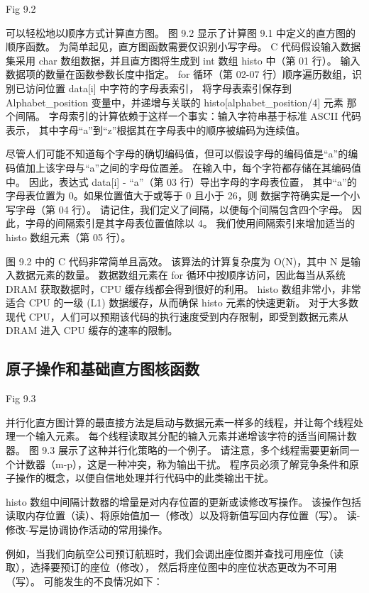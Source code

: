 {\color{red} Fig 9.2}

可以轻松地以顺序方式计算直方图。 图 9.2 显示了计算图 9.1 中定义的直方图的顺序函数。 
为简单起见，直方图函数需要仅识别小写字母。 
C 代码假设输入数据集采用 char 数组数据，并且直方图将生成到 int 数组 histo 中（第 01 行）。 
输入数据项的数量在函数参数长度中指定。 
for 循环（第 02-07 行）顺序遍历数组，识别已访问位置 data[i] 中字符的字母表索引，
将字母表索引保存到 Alphabet\_position 变量中，并递增与关联的 histo[alphabet\_position/4] 元素 那个间隔。 
字母索引的计算依赖于这样一个事实：输入字符串基于标准 ASCII 代码表示，
其中字母“a”到“z”根据其在字母表中的顺序被编码为连续值。

尽管人们可能不知道每个字母的确切编码值，但可以假设字母的编码值是“a”的编码值加上该字母与“a”之间的字母位置差。 
在输入中，每个字符都存储在其编码值中。 因此，表达式 data[i] - “a”（第 03 行）导出字母的字母表位置，
其中“a”的字母表位置为 0。如果位置值大于或等于 0 且小于 26，则 数据字符确实是一个小写字母（第 04 行）。 
请记住，我们定义了间隔，以便每个间隔包含四个字母。 因此，字母的间隔索引是其字母表位置值除以 4。
我们使用间隔索引来增加适当的 histo 数组元素（第 05 行）。

图 9.2 中的 C 代码非常简单且高效。 该算法的计算复杂度为 O(N)，其中 N 是输入数据元素的数量。 
数据数组元素在 for 循环中按顺序访问，因此每当从系统 DRAM 获取数据时，CPU 缓存线都会得到很好的利用。 
histo 数组非常小，非常适合 CPU 的一级 (L1) 数据缓存，从而确保 histo 元素的快速更新。 
对于大多数现代 CPU，人们可以预期该代码的执行速度受到内存限制，即受到数据元素从 DRAM 进入 CPU 缓存的速率的限制。

\subsection{原子操作和基础直方图核函数}
{\color{red} Fig 9.3}

并行化直方图计算的最直接方法是启动与数据元素一样多的线程，并让每个线程处理一个输入元素。 
每个线程读取其分配的输入元素并递增该字符的适当间隔计数器。 图 9.3 展示了这种并行化策略的一个例子。 
请注意，多个线程需要更新同一个计数器（m-p），这是一种冲突，称为输出干扰。 
程序员必须了解竞争条件和原子操作的概念，以便自信地处理并行代码中的此类输出干扰。

histo 数组中间隔计数器的增量是对内存位置的更新或读修改写操作。 
该操作包括读取内存位置（读）、将原始值加一（修改）以及将新值写回内存位置（写）。 读-修改-写是协调协作活动的常用操作。

例如，当我们向航空公司预订航班时，我们会调出座位图并查找可用座位（读取），选择要预订的座位（修改），
然后将座位图中的座位状态更改为不可用 （写）。 可能发生的不良情况如下：

